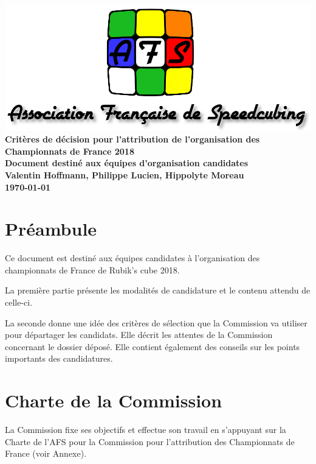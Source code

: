 \documentclass[a4paper,12pt]{scrartcl}
\begin{document}
\sloppy

\begin{titlepage}
    \centering
    \vfill
    \includegraphics[width=\textwidth]{logoafsletters.png}
    \vfill
    {\bfseries\Huge
        Critères de décision pour l'attribution de l'organisation des Championnats de France 2018\\
		\vskip1cm
	\large
        Document destiné aux équipes d'organisation candidates\\
        \vskip3cm
        Valentin Hoffmann, Philippe Lucien, Hippolyte Moreau\\
        \vskip2cm
\today
    }    
    \vfill
\end{titlepage}


\pagebreak


\section*{Préambule}

Ce document est destiné aux équipes candidates à l'organisation des championnats de France
de Rubik's cube 2018.

La première partie présente les modalités de candidature et le contenu attendu de celle-ci.

La seconde donne une idée des critères de sélection que la Commission va utiliser
pour départager les candidats. Elle décrit les attentes de la Commission concernant
le dossier déposé. Elle contient également des conseils sur les points importants des candidatures.


\section*{Charte de la Commission}
La Commission fixe ses objectifs et effectue son travail en s'appuyant sur la Charte de l'AFS pour la Commission pour l'attribution des Championnats de France (voir Annexe).
 
\end{document}
